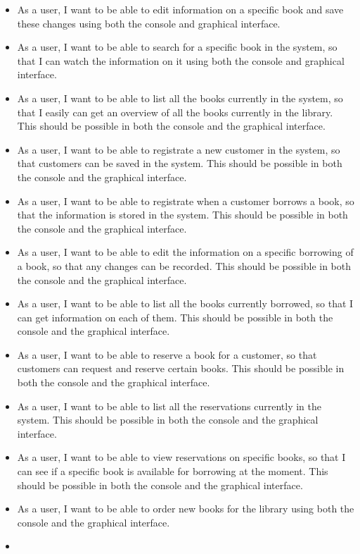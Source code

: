 \begin{itemize}
  \item As a user, I want to be able to edit information on a specific book and save these changes using both the console and graphical interface.
  \item As a user, I want to be able to search for a specific book in the system, so that I can watch the information on it using both the console and graphical interface.
  \item As a user, I want to be able to list all the books currently in the system, so that I easily can get an overview of all the books currently in the library. This should be possible in both the console and the graphical interface.
  \item As a user, I want to be able to registrate a new customer in the system, so that customers can be saved in the system. This should be possible in both the console and the graphical interface.
  \item As a user, I want to be able to registrate when a customer borrows a book, so that the information is stored in the system. This should be possible in both the console and the graphical interface.
  \item As a user, I want to be able to edit the information on a specific borrowing of a book, so that any changes can be recorded. This should be possible in both the console and the graphical interface.
  \item As a user, I want to be able to list all the books currently borrowed, so that I can get information on each of them. This should be possible in both the console and the graphical interface.
  \item As a user, I want to be able to reserve a book for a customer, so that customers can request and reserve certain books. This should be possible in both the console and the graphical interface.
  \item As a user, I want to be able to list all the reservations currently in the system. This should be possible in both the console and the graphical interface.
  \item As a user, I want to be able to view reservations on specific books, so that I can see if a specific book is available for borrowing at the moment. This should be possible in both the console and the graphical interface.
  \item As a user, I want to be able to order new books for the library using both the console and the graphical interface.
  \item 
\end{itemize}


